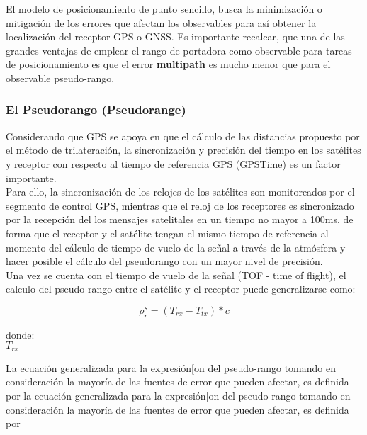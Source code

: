 El modelo de posicionamiento de punto sencillo, busca la minimización o mitigación de los errores que afectan los observables para así obtener la localización del receptor GPS o GNSS. Es importante recalcar, que una de las grandes ventajas de emplear el rango de portadora como observable para tareas de posicionamiento es que el error \textbf{multipath} es mucho menor que para el observable pseudo-rango.\\



\subsubsection{El Pseudorango (Pseudorange)}

Considerando que GPS se apoya en que el cálculo de las distancias propuesto por el método de trilateración, la sincronización y precisión del tiempo en los satélites y receptor con respecto al tiempo de referencia GPS (GPSTime) es un factor importante.\\

Para ello, la sincronización de los relojes de los satélites son monitoreados por el segmento de control GPS, mientras que el reloj de los receptores es sincronizado por la recepción del los mensajes satelitales en un tiempo no mayor a 100ms, de forma que el receptor y el satélite tengan el mismo tiempo de referencia al momento del cálculo de tiempo de vuelo de la señal a través de la atmósfera y hacer posible el cálculo del pseudorango con un mayor nivel de precisión.\\

Una vez se cuenta con el tiempo de vuelo de la señal (TOF - time of flight), el calculo del pseudo-rango entre el satélite y el receptor puede generalizarse como:

\begin{equation}
\rho_{r}^{s} = (T_{rx} -T_{tx}) * c
\label{eq:Ec1}
\end{equation}

\begin{shaded}
\noindent donde: \\ $T_{rx}$
\end{shaded}

La ecuación generalizada para la expresión[on del pseudo-rango tomando en consideración la mayoría de las fuentes de error que pueden afectar, es definida por la ecuación generalizada para la expresión[on del pseudo-rango tomando en consideración la mayoría de las fuentes de error que pueden afectar, es definida por

